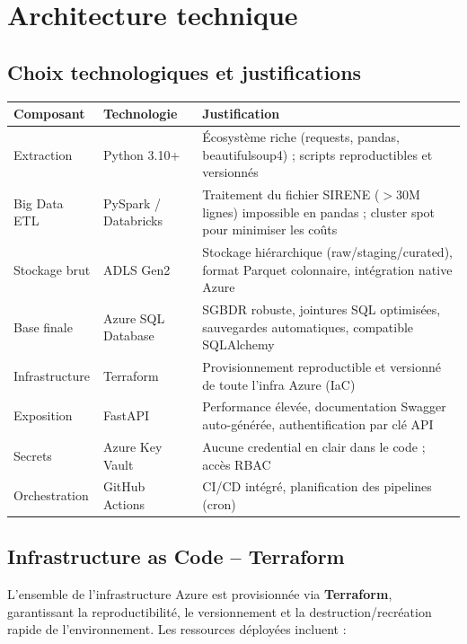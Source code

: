 \documentclass[11pt,a4paper]{article}
\begin{document}
\section{Architecture technique}

\subsection{Choix technologiques et justifications}

\begin{tabular}{L{3cm} L{3cm} L{7.5cm}}
  \toprule
  \textbf{Composant} & \textbf{Technologie} & \textbf{Justification} \\
  \midrule
  Extraction & Python 3.10+ & Écosystème riche (requests, pandas, beautifulsoup4) ; scripts reproductibles et versionnés \\
  Big Data ETL & PySpark / Databricks & Traitement du fichier SIRENE ($>$30M lignes) impossible en pandas ; cluster spot pour minimiser les coûts \\
  Stockage brut & ADLS Gen2 & Stockage hiérarchique (raw/staging/curated), format Parquet colonnaire, intégration native Azure \\
  Base finale & Azure SQL Database & SGBDR robuste, jointures SQL optimisées, sauvegardes automatiques, compatible SQLAlchemy \\
  Infrastructure & Terraform & Provisionnement reproductible et versionné de toute l'infra Azure (IaC) \\
  Exposition & FastAPI & Performance élevée, documentation Swagger auto-générée, authentification par clé API \\
  Secrets & Azure Key Vault & Aucune credential en clair dans le code ; accès RBAC \\
  Orchestration & GitHub Actions & CI/CD intégré, planification des pipelines (cron) \\
  \bottomrule
\end{tabular}

\subsection{Infrastructure as Code -- Terraform}

L'ensemble de l'infrastructure Azure est provisionnée via \textbf{Terraform}, garantissant la
reproductibilité, le versionnement et la destruction/recréation rapide de l'environnement.
Les ressources déployées incluent :
\end{document}
